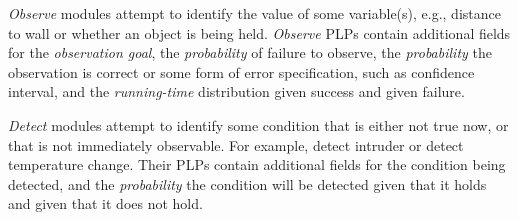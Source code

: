 \documentclass[letterpaper]{article}
\newcommand\commentout[1]{}
\begin{document}
\commentout{
Sometimes, one needs to maintain some condition in order to achieve a goal. For example, one may reach a
target position by maintaining a pre-computed path to the goal, either by iteratively reaching way-points,
or by ensuring that the heading is always in the direction of the path. One can model this behaviour using an achieve module
whose goal is to reach the target position, or as a maintain module that maintains heading along the path direction,
with the success termination condition being ``at-the-goal". The latter definition is less abstract, and clarifies what the module actually needs
to do. Given this definition, we can detect problems by alerting the operator or system whenever the actual heading is not in the direction of the path, rather than only when the goal is not reached. Of course, ultimately, the user decides which model suits her best.
}


{\em Observe\/} modules attempt to identify the value of some variable(s),
e.g., distance to wall or whether an object is being held.
{\em Observe} PLPs contain additional fields for the \textit{observation goal}, the \textit{probability} of failure to observe, the \textit{probability}
the observation is correct or some form of error specification, such as confidence interval,
and the \textit{running-time} distribution given success and given failure.

{\em Detect\/} modules attempt to identify some condition that is either not true now, or that is not immediately observable.
For example, detect intruder or detect temperature change. Their PLPs contain additional fields
for the condition being detected, and the \textit{probability} the condition will be detected given
that it holds
and given that it does not hold.
\end{document}
